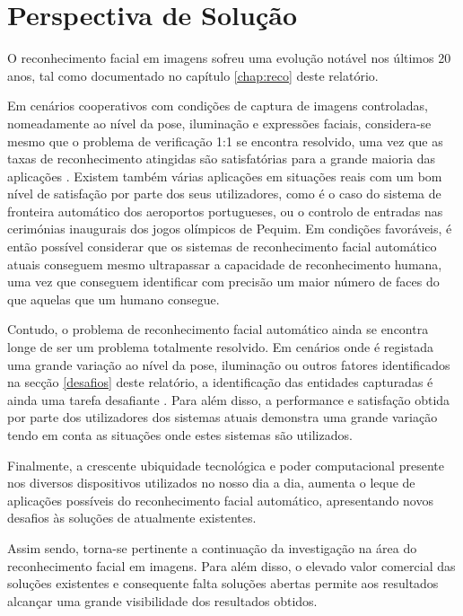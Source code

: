 \chapter{Perspectiva de Solução} \label{chap:solução}

O reconhecimento facial em imagens sofreu uma evolução notável nos últimos 20 anos, tal como documentado no capítulo \ref{chap:reco} deste relatório. 

Em cenários cooperativos com condições de captura de imagens controladas, nomeadamente ao nível da pose, iluminação e expressões faciais, considera-se mesmo que o problema de verificação 1:1 se encontra resolvido, uma vez que as taxas de reconhecimento atingidas são satisfatórias para a grande maioria das aplicações \citep{Li2011}. Existem também várias aplicações em situações reais com um bom nível de satisfação por parte dos seus utilizadores, como é o caso do sistema de fronteira automático dos aeroportos portugueses, ou o controlo de entradas nas cerimónias inaugurais dos jogos olímpicos de Pequim. Em condições favoráveis, é então possível considerar que os sistemas de reconhecimento facial automático atuais conseguem mesmo ultrapassar a capacidade de reconhecimento humana, uma vez que conseguem identificar com precisão um maior número de faces do que aquelas que um humano consegue.

Contudo, o problema de reconhecimento facial automático ainda se encontra longe de ser um problema totalmente resolvido. Em cenários onde é registada uma grande variação ao nível da pose, iluminação ou outros fatores identificados na secção \ref{desafios} deste relatório, a identificação das entidades capturadas é ainda uma tarefa desafiante  \citep{Li2011}. Para além disso, a performance e satisfação obtida por parte dos utilizadores dos sistemas atuais demonstra uma grande variação tendo em conta as situações onde estes sistemas são utilizados. 

Finalmente, a crescente ubiquidade tecnológica e poder computacional presente nos diversos dispositivos utilizados no nosso dia a dia, aumenta o leque de aplicações possíveis do reconhecimento facial automático, apresentando novos desafios às soluções de atualmente existentes.

Assim sendo, torna-se pertinente a continuação da investigação na área do reconhecimento facial em imagens. Para além disso, o elevado valor comercial das soluções existentes e consequente falta soluções abertas permite aos resultados alcançar uma grande visibilidade dos resultados obtidos.

